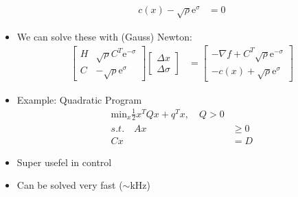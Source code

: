 \documentclass[11pt]{article}
\begin{document}
\begin{itemize}
\begin{align*}
        c(x) - \sqrt{\rho}\text{e}^\sigma &= 0
    \end{align*}
    \item We can solve these with (Gauss) Newton:
    \begin{align*}
        \begin{bmatrix}
            H & \sqrt{\rho}C^T\text{e}^{-\sigma} \\
            C & -\sqrt{\rho}\text{e}^{\sigma} 
        \end{bmatrix}
        \begin{bmatrix}
            \Delta x \\
            \Delta \sigma
        \end{bmatrix}
        &= 
        \begin{bmatrix}
            -\nabla f + C^T \sqrt{\rho}\text{e}^{-\sigma} \\
            -c(x) + \sqrt{\rho}\text{e}^\sigma        
        \end{bmatrix}
    \end{align*}
    \item Example: Quadratic Program
    \begin{align*}
        \text{min}_x \frac{1}{2}x^T Qx + q^T x, \quad Q>0
        \\
        s.t.  \quad Ax &\geq 0
        \\
        Cx &= D
    \end{align*}
    \item Super usefel in control
    \item Can be solved very fast ($\sim$kHz)
\end{itemize}
\end{document}
